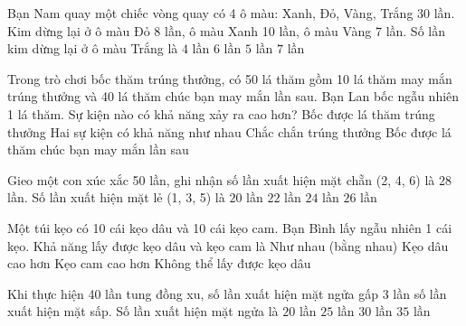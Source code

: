 \begin{ex} %
Bạn Nam quay một chiếc vòng quay có 4 ô màu: Xanh, Đỏ, Vàng, Trắng 30 lần. Kim dừng lại ở ô màu Đỏ 8 lần, ô màu Xanh 10 lần, ô màu Vàng 7 lần. Số lần kim dừng lại ở ô màu Trắng là
\choice
{$4$ lần}
{$6$ lần}
{\True $5$ lần}
{$7$ lần}
\end{ex}

\begin{ex} %
Trong trò chơi bốc thăm trúng thưởng, có 50 lá thăm gồm 10 lá thăm may mắn trúng thưởng và 40 lá thăm chúc bạn may mắn lần sau. Bạn Lan bốc ngẫu nhiên 1 lá thăm. Sự kiện nào có khả năng xảy ra cao hơn?
\choice
{Bốc được lá thăm trúng thưởng}
{Hai sự kiện có khả năng như nhau}
{Chắc chắn trúng thưởng}
{\True Bốc được lá thăm chúc bạn may mắn lần sau}
\end{ex}

\begin{ex} %
Gieo một con xúc xắc 50 lần, ghi nhận số lần xuất hiện mặt chẵn (2, 4, 6) là 28 lần. Số lần xuất hiện mặt lẻ (1, 3, 5) là
\choice
{$20$ lần}
{\True $22$ lần}
{$24$ lần}
{$26$ lần}
\end{ex}

\begin{ex} %
Một túi kẹo có 10 cái kẹo dâu và 10 cái kẹo cam. Bạn Bình lấy ngẫu nhiên 1 cái kẹo. Khả năng lấy được kẹo dâu và kẹo cam là
\choice
{\True Như nhau (bằng nhau)}
{Kẹo dâu cao hơn}
{Kẹo cam cao hơn}
{Không thể lấy được kẹo dâu}
\end{ex}

\begin{ex} %
Khi thực hiện 40 lần tung đồng xu, số lần xuất hiện mặt ngửa gấp 3 lần số lần xuất hiện mặt sấp. Số lần xuất hiện mặt ngửa là
\choice
{$20$ lần}
{$25$ lần}
{\True $30$ lần}
{$35$ lần}
\end{ex}

